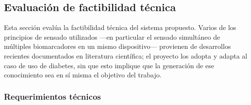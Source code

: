 \subsection{Evaluación de factibilidad técnica}




Esta sección evalúa la factibilidad técnica del sistema propuesto. Varios de los principios de sensado utilizados —en particular el sensado simultáneo de múltiples biomarcadores en un mismo dispositivo— provienen de desarrollos recientes documentados en literatura científica; el proyecto los adopta y adapta al caso de uso de diabetes, sin que esto implique que la generación de ese conocimiento sea en sí misma el objetivo del trabajo.

\subsubsection{Requerimientos técnicos}




